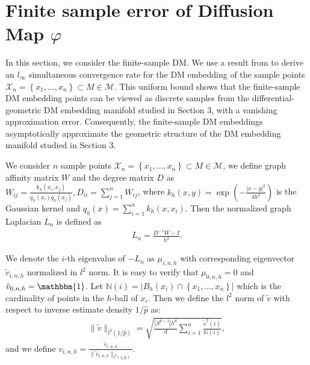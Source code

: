 \section{Finite sample error of Diffusion Map \texorpdfstring{$\varphi$}{phi}}
        \label{sec:convergence}

In this section, we consider the finite-sample DM. We use a result from \cite{DUNSON2021282} to derive an $l_\infty$ simultaneous convergence rate for the DM embedding of the sample points $\mathcal{X}_n=\left\{x_1,\dots,x_n\right\}\subset M \in \mathcal{M}$. This uniform bound shows that the finite-sample DM embedding points can be viewed as discrete samples from the differential-geometric DM embedding manifold studied in Section 3, with a vanishing approximation error. Consequently, the finite-sample DM embeddings asymptotically approximate the geometric structure of the DM embedding manifold studied in Section 3.

We consider $n$ sample points $\mathcal{X}_n=\left\{x_1,\dots,x_n\right\}\subset M \in \mathcal{M}$, we define graph affinity matrix $W$ and the degree matrix $D$ as $W_{ij}=\frac{k_h (x_i,x_j)}{q_h(x_i)q_h(x_j)}, D_{ii}=\sum_{j=1}^n W_{ij}$,
where $k_h(x,y)=\exp \left(-\frac{|x-y|^2}{4h^2}\right)$ is the Gaussian kernel and $q_h(x)=\sum_{i=1}^n k_h(x,x_i)$. Then the normalized graph Laplacian $L_n$ is defined as 
\begin{align}
\label{Lap matrix}
L_n=\frac{D^{-1}W-I}{h^2}.
\end{align}

We denote the $i$-th eigenvalue of $-L_n$ as $\mu_{i,n,h}$ with corresponding eigenvector $\tilde{v}_{i,n,h}$ normalized in $l^2$ norm. It is easy to verify that $\mu_{0,n,h}=0$ and $\tilde{v}_{0,n,h} = \mathbbm{1}$. Let $\mathbb{N}(i)=|B_h(x_i) \cap \left\{x_1,\dots,x_n\right\}|$ which is the cardinality of points in the $h$-ball of $x_i$. Then we define the $l^2$ norm of $\tilde{v}$ with respect to inverse estimate density $1/\hat{p}$ as:
\begin{align}
	\|\tilde{v}\|_{l^2(1/\hat{p})} = \sqrt{\frac{|S^{d-1}|h^d}{d}\sum_{i=1}^{n}\frac{\tilde{v}^2(i)}{\mathbb{N}(i)}},
\end{align}
and we define $v_{i,n,h}=\frac{\tilde{v}_{i,n,h}}{\|\tilde{v}_{i,n,h}\|_{l^2(1/\hat{p})}}$.


